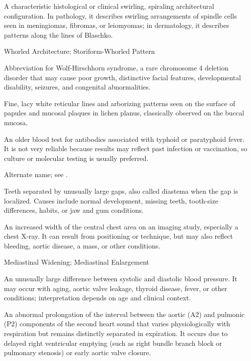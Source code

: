  A characteristic histological or clinical swirling, spiraling architectural configuration. In pathology, it describes swirling arrangements of spindle cells seen in meningiomas, fibromas, or leiomyomas; in dermatology, it describes patterns along the lines of Blaschko.

\synonyms
Whorled Architecture; Storiform-Whorled Pattern

 Abbreviation for Wolf-Hirschhorn syndrome, a rare chromosome 4 deletion disorder that may cause poor growth, distinctive facial features, developmental disability, seizures, and congenital abnormalities.

 Fine, lacy white reticular lines and arborizing patterns seen on the surface of papules and mucosal plaques in lichen planus, classically observed on the buccal mucosa.

 An older blood test for antibodies associated with typhoid or paratyphoid fever. It is not very reliable because results may reflect past infection or vaccination, so culture or molecular testing is usually preferred.

 Alternate name; see .

 Teeth separated by unusually large gaps, also called diastema when the gap is localized. Causes include normal development, missing teeth, tooth-size differences, habits, or jaw and gum conditions.

 An increased width of the central chest area on an imaging study, especially a chest X-ray. It can result from positioning or technique, but may also reflect bleeding, aortic disease, a mass, or other conditions.

\synonyms
Mediastinal Widening; Mediastinal Enlargement

 An unusually large difference between systolic and diastolic blood pressure. It may occur with aging, aortic valve leakage, thyroid disease, fever, or other conditions; interpretation depends on age and clinical context.

 An abnormal prolongation of the interval between the aortic (A2) and pulmonic (P2) components of the second heart sound that varies physiologically with respiration but remains distinctly separated in expiration. It occurs due to delayed right ventricular emptying (such as right bundle branch block or pulmonary stenosis) or early aortic valve closure.

